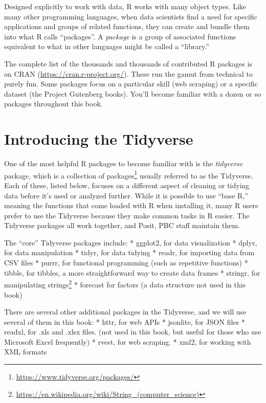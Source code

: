\documentclass[
  krantz2]{krantz}
\begin{document}
Designed explicitly to work with data, R works with many object types. Like many other programming languages, when data scientists find a need for specific applications and groups of related functions, they can create and bundle them into what R calls ``packages''. A \emph{package} is a group of associated functions equivalent to what in other languages might be called a ``library.''

The complete list of the thousands and thousands of contributed R packages is on CRAN (\url{https://cran.r-project.org/}). These run the gamut from technical to purely fun. Some packages focus on a particular skill (web scraping) or a specific dataset (the Project Gutenberg books). You'll become familiar with a dozen or so packages throughout this book.

\hypertarget{tidyverse}{%
\section{Introducing the Tidyverse}\label{tidyverse}}

One of the most helpful R packages to become familiar with is the \emph{tidyverse} package, which is a collection of packages\footnote{\url{https://www.tidyverse.org/packages/}} usually referred to as the Tidyverse. Each of these, listed below, focuses on a different aspect of cleaning or tidying data before it's used or analyzed further. While it is possible to use ``base R,'' meaning the functions that come loaded with R when installing it, many R users prefer to use the Tidyverse because they make common tasks in R easier. The Tidyverse packages all work together, and Posit, PBC staff maintain them.

The ``core'' Tidyverse packages include:
* ggplot2, for data visualization
* dplyr, for data manipulation
* tidyr, for data tidying
* readr, for importing data from CSV files
* purrr, for functional programming (such as repetitive functions)
* tibble, for tibbles, a more straightforward way to create data frames
* stringr, for manipulating strings\footnote{\url{https://en.wikipedia.org/wiki/String_(computer_science)}}
* forecast for factors (a data structure not used in this book)

There are several other additional packages in the Tidyverse, and we will use several of them in this book:
* httr, for web APIs
* jsonlite, for JSON files
* readxl, for .xls and .xlsx files. (not used in this book, but useful for those who use Microsoft Excel frequently)
* rvest, for web scraping.
* xml2, for working with XML formats
\end{document}
